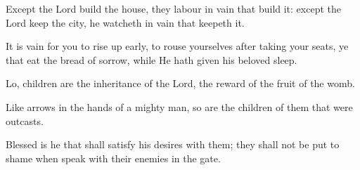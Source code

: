 Except the Lord build the house, they labour in vain that build it: except the Lord keep the city, he watcheth in vain that keepeth it.

It is vain for you to rise up early, to rouse yourselves after taking your seats, ye that eat the bread of sorrow, while He hath given his beloved sleep.

Lo, children are the inheritance of the Lord, the reward of the fruit of the womb.

Like arrows in the hands of a mighty man, so are the children of them that were outcasts.

Blessed is he that shall satisfy his desires with them; they shall not be put to shame when speak with their enemies in the gate.
